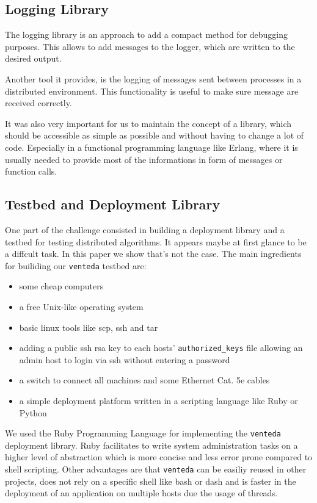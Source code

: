 \documentclass[10pt,a4wide]{article}
\begin{document}
\subsection{Logging Library}
The logging library is an approach to add a compact method for debugging purposes. This allows to add messages to the logger, which are written to the desired output.

Another tool it provides, is the logging of messages sent between processes in a distributed environment. This functionality is useful to make sure message are received correctly.

It was also very important for us to maintain the concept of a library, which should be accessible as simple as possible and without having to change a lot of code.
Especially in a functional programming language like Erlang, where it is usually needed to provide most of the informations in form of messages or function calls.

\subsection{Testbed and Deployment Library}
One part of the challenge consisted in building a deployment library and a testbed for testing distributed algorithms. It appears maybe at first glance to be a diffcult task. In this paper we show that's not the case. The main ingredients for builiding our \texttt{venteda} testbed are:
\begin{itemize}
\itemsep0em 
\item some cheap computers
\item a free Unix-like operating system
\item basic linux tools like scp, ssh and tar
\item adding a public ssh rsa key to each hosts' \texttt{authorized\_keys} file allowing an admin host to login via ssh without entering a password
\item a switch to connect all machines and some Ethernet Cat. 5e cables 
\item a simple deployment platform written in a scripting language like Ruby or Python
\end{itemize}
We used the Ruby Programming Language for implementing the \texttt{venteda} deployment library. Ruby facilitates to write system administration tasks on a higher level of abstraction which is more concise and less error prone compared to shell scripting. Other advantages are that \texttt{venteda} can be easiliy reused in other projects, does not rely on a specific shell like bash or dash and is faster in the deployment of an application on multiple hosts due the usage of threads.
\end{document}
